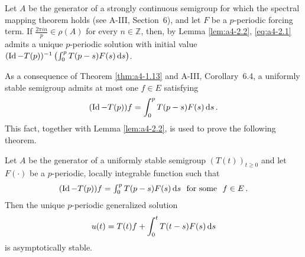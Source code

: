 \begin{remark}\label{rem:a4-2.3}
Let $A$ be the generator of a strongly continuous semigroup for which the spectral mapping theorem holds (see A-III, Section~6), and let $F$ be a $p$-periodic forcing term.
If $\frac{2\pi in}{p} \in \rho(A)$ for every $n \in \mathbb{Z}$, then, by Lemma \ref{lem:a4-2.2}, \eqref{eq:a4-2.1}
admits a unique $p$-periodic solution with initial value $(\operatorname{Id} - T(p))^{-1} \left(\int_{0}^{p} T(p-s)F(s)  \mathop{}\!\mathrm{d}{s}\right)$.
\end{remark}
As a consequence of Theorem \ref{thm:a4-1.13}  and A-III, Corollary~6.4,  a uniformly stable semigroup admits at most one $f \in E$ satisfying 
\[
(\operatorname{Id}-T(p))f = \int_{0}^{p} T(p-s)F(s)  \mathop{}\!\mathrm{d}{s}\,.
\]
This fact, together with Lemma \ref{lem:a4-2.2}, is used to prove the following theorem.
\begin{theorem}\label{thm:a4-2.4}
Let $A$ be the generator of a uniformly stable semigroup $(T(t))_{t \geq 0}$ and let $F(\cdot)$ be a $p$-periodic, locally integrable function such that \[\textstyle{
(\operatorname{Id}- T(p))f = \int_{0}^{p} T(p-s)F(s)  \mathop{}\!\mathrm{d}{s}\ \text{ for some } \ f \in E\,.
}\]
Then the unique $p$-periodic generalized solution
\[
u(t) = T(t)f + \int_{0}^{t} T(t-s)F(s)  \mathop{}\!\mathrm{d}{s}
\]
is asymptotically stable.
\end{theorem}
